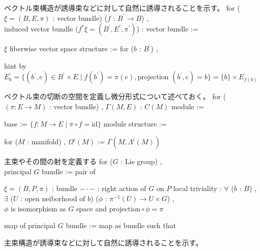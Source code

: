 \begin{Definition}
\itemnote
  ベクトル束構造が誘導束などに対して自然に誘導されることを示す。
\itemdefi
  for (\(\xi = (B , E , \pi)\) : vector bundle) (\(f\) : \(B^{\prime} \to B\)) ,\\
  induced vector bundle (\(f^*\xi = (B^{\prime} , E^{\prime} , \pi^{\prime})\)) : vector bundle :=
  \begin{itemize}
    \itemenum \(\xi\)
    \itemenum fiberwise vector space structure :=
      for (\(b\) : \(B^{\prime}\)) , 
  \end{itemize}
  hint by \(E^{\prime}_b = \{(b^{\prime} , e) \in B^{\prime} \times E \mid f(b^{\prime}) = \pi(e) , \text{projection }(b^{\prime} , e) = b\} = \{b\} \times E_{f(b)}\)
\end{Definition}

\begin{Definition}
\itemnote
  ベクトル束の切断の空間を定義し微分形式について述べておく。
\itemdefi
  for (\((\pi : E \to M)\) : vector bundle) , \(\Gamma(M , E)\) : \(C(M)\) module :=
  \begin{itemize}
    \itemenum base := \(\{f : M \to E \mid \pi \circ f = \text{id}\}\)
    \itemenum module structure := 
  \end{itemize}
\itemdefi
 for (\(M\) : manifold) , \(\Omega^i(M)\) := \(\Gamma(M , \Lambda^i(M))\)
\end{Definition}

\begin{Definition}
\itemnote 主束やその間の射を定義する
\itemdefi
  for (\(G\) : Lie group) , \\
  principal \(G\) bundle := pair of
  \begin{itemize}
    \itemenum \(\xi = (B , P , \pi)\) : bundle
    \itemenum \(- \cdot -\) : right action of \(G\) on \(P\)
    \itemwith local triviality :
      \(\forall\) (\(b\) : \(B\)) , \\
      \(\exists\) (\(U\) : open neiborhood of \(b\)) (\(\phi\) : \(\pi^{-1}(U) \to U \times G\)) , \\
      \(\phi\) is isomorphism as \(G\) space and \(\text{projection} \circ \phi = \pi\)
  \end{itemize}
\itemdefi
  map of principal \(G\) bundle := map as bundle such that 
\end{Definition}

\begin{Definition}
\itemnote 主束構造が誘導束などに対して自然に誘導されることを示す。
\WIP
\end{Definition}

